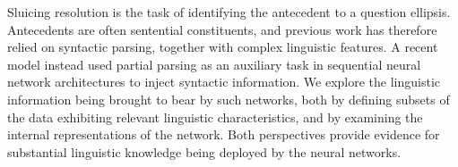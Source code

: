 Sluicing resolution is the task of identifying the antecedent to a question ellipsis. Antecedents are often sentential constituents, and previous work has therefore relied on syntactic parsing, together with complex linguistic features. A recent model instead used partial parsing as an auxiliary task in sequential neural network architectures to inject syntactic information. We explore the linguistic information being brought to bear by such networks, both by defining subsets of the data exhibiting relevant linguistic characteristics, and by examining the internal representations of the network. Both perspectives provide evidence for substantial linguistic knowledge being deployed by the neural networks.
